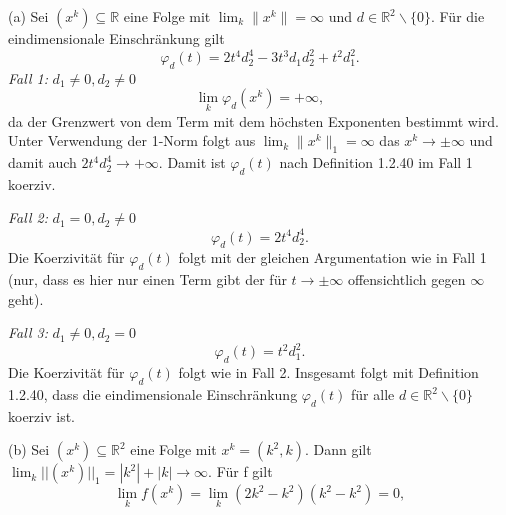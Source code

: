 \documentclass[ngerman, a4paper,12pt]{article}
\begin{document}
(a) Sei $(x^k) \subseteq \mathbb{R}$ eine Folge mit $\lim_k \| x^k \| = \infty$ und $d \in \mathbb{R}^2 \backslash \{0\}$. Für die eindimensionale Einschränkung gilt 
\begin{equation*}
	\varphi_d(t) = 2t^4d_2^4 - 3t^3d_1d_2^2 + t^2 d_1^2.
\end{equation*}
\textit{Fall 1:} $d_1 \neq 0, d_2 \neq 0$
\begin{equation}
	\lim\limits_{k} \varphi_d(x^k) = + \infty,
\end{equation}
da der Grenzwert von dem Term mit dem höchsten Exponenten bestimmt wird. Unter Verwendung der 1-Norm folgt aus $\lim_k \| x^k \|_1 = \infty$ das $x^k \rightarrow \pm \infty$ und damit auch $2t^4d_2^4 \rightarrow + \infty$. Damit ist $\varphi_d(t)$ nach Definition 1.2.40 im Fall 1 koerziv. \par
\textit{Fall 2:} $d_1 = 0, d_2 \neq 0$
\begin{equation}
	\varphi_d(t) = 2t^4d_2^4.
\end{equation}
Die Koerzivität für $\varphi_d(t)$ folgt mit der gleichen Argumentation wie in Fall 1 (nur, dass es hier nur einen Term gibt der für $t \rightarrow \pm \infty$ offensichtlich gegen $\infty$ geht). \par
\textit{Fall 3:} $d_1 \neq 0, d_2 = 0$
\begin{equation}
	\varphi_d(t) = t^2d_1^2.
\end{equation}
Die Koerzivität für $\varphi_d(t)$ folgt wie in Fall 2. Insgesamt folgt mit Definition 1.2.40, dass die eindimensionale Einschränkung $\varphi_d(t)$ für alle $d \in \mathbb{R}^2  \backslash \{0\}$ koerziv ist.
\par
(b) Sei $(x^k) \subseteq \mathbb{R}^2$ eine Folge mit $x^k = (k^2, k)$. Dann gilt $\lim_k ||(x^k)||_1 = |k^2|+|k| \rightarrow \infty$. Für f gilt
\begin{equation}
	\lim\limits_{k} f(x^k) = \lim\limits_{k} (2k^2-k^2)(k^2-k^2) = 0,
\end{equation}
\end{document}

